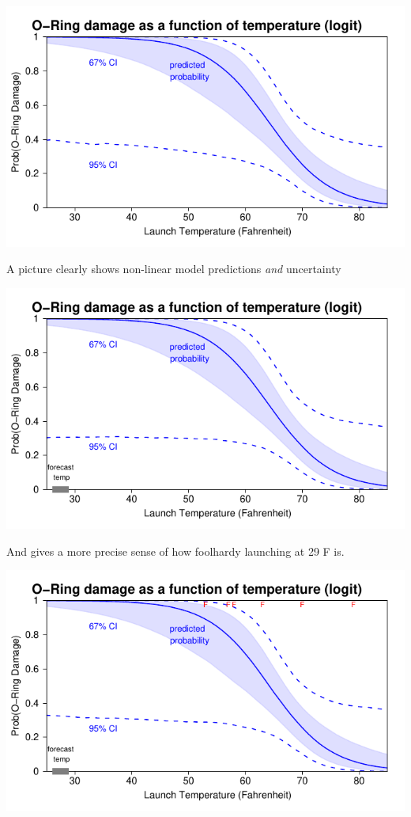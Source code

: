 \documentclass[pdflatex,landscape,titlepage]{foils}
\begin{document}
\begin{center}
\includegraphics[width=10.5 in]{chall1}
\end{center}

A picture clearly shows non-linear model predictions \emph{and} uncertainty

\foilhead[-0.75in]{}


\begin{center}
\includegraphics[width=10.5 in]{chall2}
\end{center}

And gives a more precise sense of how foolhardy launching at 29 F is.

\foilhead[-0.75in]{}


\begin{center}
\includegraphics[width=10.5 in]{chall3}
\end{center}
\end{document}
